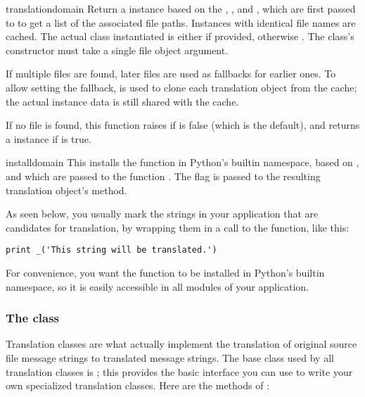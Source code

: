 \begin{funcdesc}{translation}{domain}
Return a  instance based on the ,
, and , which are first passed to
 to get a list of the
associated  file paths.  Instances with
identical  file names are cached.  The actual class instantiated
is either  if provided, otherwise
.  The class's constructor must take a single
file object argument.  

If multiple files are found, later files are used as fallbacks for
earlier ones. To allow setting the fallback, 
is used to clone each translation object from the cache; the actual
instance data is still shared with the cache.

If no  file is found, this function raises
 if  is false (which is the default),
and returns a  instance if  is
true.
\end{funcdesc}

\begin{funcdesc}{install}{domain}
This installs the function \function{_} in Python's builtin namespace,
based on , and  which are passed to the
function .  The  flag is passed to
the resulting translation object's  method.

As seen below, you usually mark the strings in your application that are
candidates for translation, by wrapping them in a call to the
\function{_()} function, like this:

\begin{verbatim}
print _('This string will be translated.')
\end{verbatim}

For convenience, you want the \function{_()} function to be installed in
Python's builtin namespace, so it is easily accessible in all modules
of your application.  
\end{funcdesc}

\subsubsection{The  class}
Translation classes are what actually implement the translation of
original source file message strings to translated message strings.
The base class used by all translation classes is
; this provides the basic interface you can use
to write your own specialized translation classes.  Here are the
methods of :

